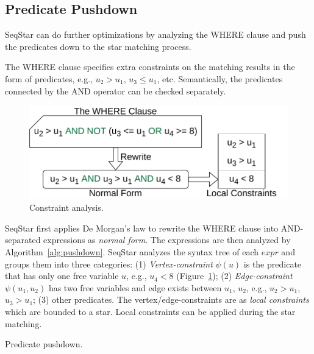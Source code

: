 \subsection{Predicate Pushdown}\label{sec:match_optimize}
SeqStar can do further optimizations by analyzing the WHERE clause and push the predicates down to the star matching process.

The WHERE clause specifies extra constraints on the matching results in the form of predicates,
e.g., $u_2 > u_1$, $u_3 \le u_1$, etc.
Semantically, the predicates connected by the AND operator can be checked separately.

\begin{figure}[ht]
  \centering
  \includegraphics[width=.4\textwidth]{img/constraints.pdf}
  \caption{Constraint analysis.}\label{img:constraints}
\end{figure}

SeqStar first applies De Morgan's law to rewrite the WHERE clause into AND-separated expressions as \emph{normal form}.
The expressions are then analyzed by Algorithm~\ref{alg:pushdown}.
SeqStar analyzes the syntax tree of each $expr$ and groups them into three categories:
(1) \emph{Vertex-constraint} $\psi(u)$ is the predicate that has only one free variable $u$, e.g., $u_4 < 8$ (Figure~\ref{img:constraints});
(2) \emph{Edge-constraint} $\psi(u_1, u_2)$ has two free variables and edge exists between $u_1$, $u_2$, e.g., $u_2 > u_1$, $u_3 > u_1$;
(3) other predicates.
The vertex/edge-constraints are as \emph{local constraints} which are bounded to a star.
Local constraints can be applied during the star matching.

\begin{algorithm}[ht]
  \caption{Predicate pushdown.}\label{alg:pushdown}
\end{algorithm}

